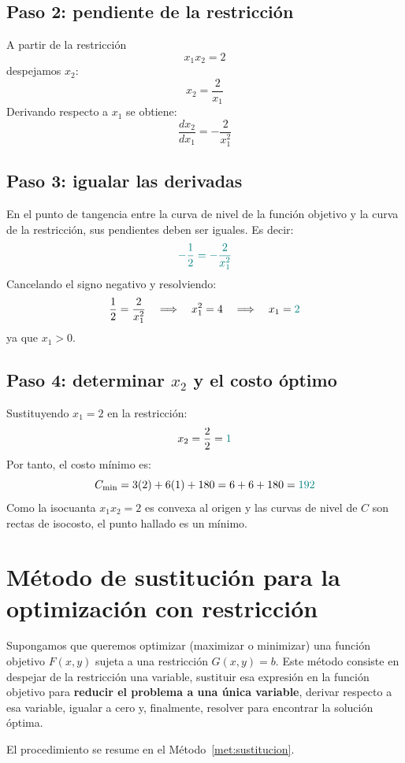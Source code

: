 \documentclass{article}
\begin{document}
\subsection*{Paso 2: pendiente de la restricción}
A partir de la restricción
\[
x_1 x_2 = 2
\]
despejamos \(x_2\):
\[
x_2 = \frac{2}{x_1}
\]
Derivando respecto a \(x_1\) se obtiene:
\[
\frac{dx_2}{dx_1} = -\frac{2}{x_1^2}
\]
 
\subsection*{Paso 3: igualar las derivadas}
En el punto de tangencia entre la curva de nivel de la función objetivo y la curva de la restricción, sus pendientes deben ser iguales. Es decir:
\[\color{teal}
-\frac{1}{2} = -\frac{2}{x_1^2}
\]
Cancelando el signo negativo y resolviendo:
\[
\frac{1}{2} = \frac{2}{x_1^2} \quad\Longrightarrow\quad x_1^2 = 4 \quad\Longrightarrow\quad x_1 = {\color{teal}2}
\]
ya que \(x_1>0\).
 
\subsection*{Paso 4: determinar \(x_2\) y el costo óptimo}
Sustituyendo \(x_1=2\) en la restricción:
\[
x_2 = \frac{2}{2} = {\color{teal}1}
\]
Por tanto, el costo mínimo es:
\[
C_{\min} = 3(2) + 6(1) + 180 = 6 + 6 + 180 = {\color{teal}192}
\]
Como la isocuanta \(x_1x_2=2\) es convexa al origen y las curvas de nivel de \(C\) son rectas de isocosto, el punto hallado es un mínimo.
 
 
\section*{Método de sustitución para la optimización con restricción}
 
Supongamos que queremos optimizar (maximizar o minimizar) una función objetivo \(F(x,y)\) sujeta a una restricción \(G(x,y)=b\). Este método consiste en despejar de la restricción una variable, sustituir esa expresión en la función objetivo para \textbf{\color{teal}reducir el problema a una única variable}, derivar respecto a esa variable, igualar a cero y, finalmente, resolver para encontrar la solución óptima.
 
El procedimiento se resume en el Método~\ref{met:sustitucion}.
 
\end{document}
